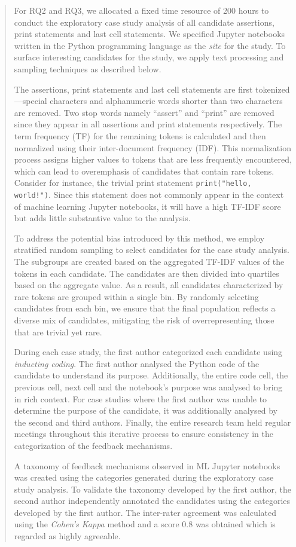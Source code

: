 \documentclass[11pt,fleqn]{article}
\begin{document}
\begin{quote}
  For RQ2 and RQ3, we allocated a fixed time resource of 200 hours to conduct the exploratory case study analysis of all candidate assertions, print statements and last cell statements. We specified Jupyter notebooks written in the Python programming language as the \emph{site} for the study. To surface interesting candidates for the study, we apply text processing and sampling techniques as described below.

  The assertions, print statements and last cell statements are first tokenized---special characters and alphanumeric words shorter than two characters are removed. Two stop words namely ``assert'' and ``print'' are removed since they appear in all assertions and print statements respectively. The term frequency (TF) for the remaining tokens is calculated and then normalized using their inter-document frequency (IDF). This normalization process assigns higher values to tokens that are less frequently encountered, which can lead to overemphasis of candidates that contain rare tokens. Consider for instance, the trivial print statement \texttt{print("hello, world!")}. Since this statement does not commonly appear in the context of machine learning Jupyter notebooks, it will have a high TF-IDF score but adds little substantive value to the analysis.

  To address the potential bias introduced by this method, we employ stratified random sampling to select candidates for the case study analysis. The subgroups are created based on the aggregated TF-IDF values of the tokens in each candidate. The candidates are then divided into quartiles based on the aggregate value. As a result, all candidates characterized by rare tokens are grouped within a single bin. By randomly selecting candidates from each bin, we ensure that the final population reflects a diverse mix of candidates, mitigating the risk of overrepresenting those that are trivial yet rare.

  During each case study, the first author categorized each candidate using \emph{inducting coding}. The first author analysed the Python code of the candidate to understand its purpose. Additionally, the entire code cell, the previous cell, next cell and the notebook's purpose was analysed to bring in rich context. For case studies where the first author was unable to determine the purpose of the candidate, it was additionally analysed by the second and third authors. Finally, the entire research team held regular meetings throughout this iterative process to ensure consistency in the categorization of the feedback mechanisms.

  A taxonomy of feedback mechanisms observed in ML Jupyter notebooks was created using the categories generated during the exploratory case study analysis. To validate the taxonomy developed by the first author, the second author independently annotated the candidates using the categories developed by the first author. The inter-rater agreement was calculated using the \emph{Cohen's Kappa} method and a score 0.8 was obtained which is regarded as highly agreeable.
\end{quote}
\end{document}
